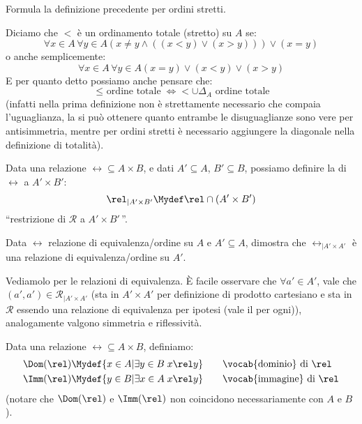 \documentclass[11pt]{scrartcl}
\begin{document}
\begin{exercise}
	Formula la definizione precedente per ordini stretti.
\end{exercise}

\begin{soln}
Diciamo che $<$ è un ordinamento totale (stretto) su $A$ se:
\[ \forall x \in A \, \forall y \in A (x \ne y \land ((x < y) \lor (x > y))) \lor (x = y)
	\]
o anche semplicemente:
\[ \forall x \in A \, \forall y \in A (x = y) \lor (x < y) \lor (x > y)
	\]
E per quanto detto possiamo anche pensare che:
\[ \text{$\leq$ ordine totale} \iff \text{$< \cup \Delta_A$ ordine totale}
	\]
(infatti nella prima definizione non è strettamente necessario che compaia l'uguaglianza, la si può ottenere quanto entrambe le disuguaglianze sono vere per antisimmetria, mentre per ordini stretti è necessario aggiungere la diagonale nella definizione di totalità).
\end{soln}

\begin{definition}
	Data una relazione $\rel \subseteq A \times B$, e dati $A' \subseteq A$, $B' \subseteq B$, possiamo definire la  di $\rel$ a $A'\times B'$:
	\[ \rel_{|A' \times B'} \Mydef \rel \cap (A' \times B')
		\]
	``restrizione di $\mathcal R$ a $A' \times B'$\,''.
\end{definition}

\begin{exercise}
	Data $\rel$ relazione di equivalenza/ordine su $A$ e $A' \subseteq A$, dimostra che $\rel_{|A' \times A'}$ è una relazione di equivalenza/ordine su $A'$.
\end{exercise}

\begin{soln}
Vediamolo per le relazioni di equivalenza. È facile osservare che $\forall a' \in A'$, vale che $(a',a') \in \mathcal{R}_{|A' \times A'}$ (sta in $A' \times A'$ per definizione di prodotto cartesiano e sta in $\mathcal{R}$ essendo una relazione di equivalenza per ipotesi (vale il per ogni)),
analogamente valgono simmetria e riflessività. 
\end{soln}

\begin{definition}
	Data una relazione $\rel \subseteq A \times B$, definiamo:
	\[  \begin{split}
		\Dom(\rel) &\Mydef \{x \in A | \exists y \in B \; x\rel y\} \qquad \text{\vocab{dominio} di $\rel$} \\
	    \Imm(\rel) &\Mydef \{y \in B | \exists x \in A \; x \rel y \} \qquad \text{\vocab{immagine} di $\rel$}
	\end{split}
			\]
	(notare che $\Dom(\rel)$ e $\Imm(\rel)$ non coincidono necessariamente con $A$ e $B$).
\end{definition}
\end{document}
